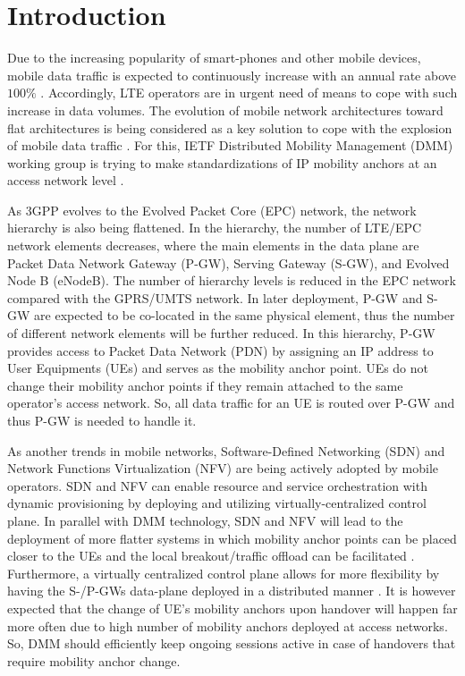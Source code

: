 \documentclass[runningheads,a4paper]{llncs}
\begin{document}
\section{Introduction}

Due to the increasing popularity of smart-phones and other mobile devices, mobile data traffic is expected to continuously increase with an annual rate above $100\%$ \cite{ref2}. Accordingly, LTE operators are in urgent need of means to cope with such increase in data volumes. The evolution of mobile network architectures toward flat architectures is being considered as a key solution to cope with the explosion of mobile data traffic \cite{ref5}. For this, IETF Distributed Mobility Management (DMM) working group is trying to make standardizations of IP mobility anchors at an access network level \cite{ref6,ref7}. 

As 3GPP evolves to the Evolved Packet Core (EPC) network, the network hierarchy is also being flattened. In the hierarchy, the number of LTE/EPC network elements decreases, where the main elements in the data plane are Packet Data Network Gateway (P-GW), Serving Gateway (S-GW), and Evolved Node B (eNodeB). The number of hierarchy levels is reduced in the EPC network compared with the GPRS/UMTS network. In later deployment, P-GW and S-GW are expected to be co-located in the same physical element, thus the number of different network elements will be further reduced. In this hierarchy, P-GW provides access to Packet Data Network (PDN) by assigning an IP address to User Equipments (UEs) and serves as the mobility anchor point. UEs do not change their mobility anchor points if they remain attached to the same operator's access network. So, all data traffic for an UE is routed over P-GW and thus P-GW is needed to handle it.

As another trends in mobile networks, Software-Defined Networking (SDN) and Network Functions Virtualization (NFV) are being actively adopted by mobile operators. SDN and NFV can enable resource and service orchestration with dynamic provisioning by deploying and utilizing virtually-centralized control plane. In parallel with DMM technology, SDN and NFV will lead to the deployment of more flatter systems in which mobility anchor points can be placed closer to the UEs and the local breakout/traffic offload can be facilitated \cite{ref8}. Furthermore, a virtually centralized control plane allows for more flexibility by having the S-/P-GWs data-plane deployed in a distributed manner \cite{ref8-1}. It is however expected that the change of UE's mobility anchors upon handover will happen far more often due to high number of mobility anchors deployed at access networks. So, DMM should efficiently keep ongoing sessions active in case of handovers that require mobility anchor change. 
\end{document}
